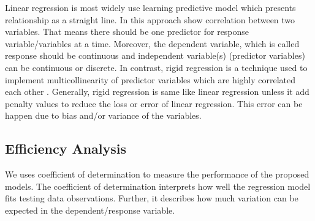 Linear regression is most widely use learning predictive model 
which presents relationship as a straight line.
In this approach show correlation between two variables.
That means there should be one predictor for response variable/variables at a time.
Moreover, the dependent variable, which is called 
response should be continuous and independent 
variable(s) (predictor variables) can be continuous or discrete. 
In contrast, rigid regression is a technique used 
to implement multicollinearity of predictor variables 
which are highly correlated each other \cite{dong2016moving}.
Generally, rigid regression is same like 
linear regression unless it add penalty values 
to reduce the loss or error of linear regression.
This error can  be happen due to bias and/or variance of the variables.

\subsection{Efficiency Analysis}
We uses coefficient of determination to measure the performance of the proposed models. 
The coefficient of determination interprets 
how well the regression model fits testing data observations.
Further, it describes how much variation 
can be expected in the dependent/response variable.

